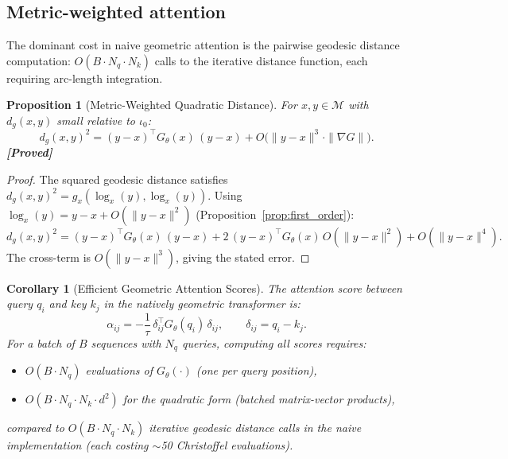 \documentclass[11pt,a4paper]{article}
\newtheorem{proposition}[theorem]{Proposition}
\newtheorem{corollary}[theorem]{Corollary}
\theoremstyle{definition}
\theoremstyle{remark}
\newcommand{\statusproved}{\textcolor{green!50!black}{\textbf{[Proved]}}}
\begin{document}
\subsection{Metric-weighted attention}\label{sec:metric_attention}

The dominant cost in naive geometric attention is the pairwise 
geodesic distance computation: $O(B \cdot N_q \cdot N_k)$ calls 
to the iterative distance function, each requiring arc-length 
integration.

\begin{proposition}[Metric-Weighted Quadratic Distance]%
\label{prop:metric_dist}
For $x, y \in \mathcal{M}$ with $d_g(x,y)$ small relative to 
$\iota_0$:
\begin{equation}\label{eq:metric_dist}
    d_g(x, y)^2 = (y - x)^\top G_\theta(x)\, (y - x) 
    + O\!\bigl(\|y - x\|^3 \cdot \|\nabla G\|\bigr).
\end{equation}
\statusproved
\end{proposition}

\begin{proof}
The squared geodesic distance satisfies 
$d_g(x,y)^2 = g_x(\log_x(y), \log_x(y))$. Using 
$\log_x(y) = y - x + O(\|y-x\|^2)$ 
(Proposition~\ref{prop:first_order}):
\[
  d_g(x,y)^2 = (y-x)^\top G_\theta(x)\,(y-x) 
  + 2\,(y-x)^\top G_\theta(x)\, O(\|y-x\|^2) 
  + O(\|y-x\|^4).
\]
The cross-term is $O(\|y-x\|^3)$, giving the stated error.
\end{proof}

\begin{corollary}[Efficient Geometric Attention Scores]%
\label{cor:efficient_attention}
The attention score between query $q_i$ and key $k_j$ in the 
natively geometric transformer is:
\begin{equation}\label{eq:geo_attention_score}
    \alpha_{ij} = -\frac{1}{\tau}\,\delta_{ij}^\top 
    G_\theta(q_i)\, \delta_{ij}, \qquad 
    \delta_{ij} = q_i - k_j.
\end{equation}
For a batch of $B$ sequences with $N_q$ queries, computing all 
scores requires:
\begin{itemize}[nosep]
  \item $O(B \cdot N_q)$ evaluations of $G_\theta(\cdot)$ 
  (one per query position),
  \item $O(B \cdot N_q \cdot N_k \cdot d^2)$ for the 
  quadratic form (batched matrix-vector products),
\end{itemize}
compared to $O(B \cdot N_q \cdot N_k)$ iterative geodesic 
distance calls in the naive implementation (each costing 
$\sim$50 Christoffel evaluations).
\end{corollary}
\end{document}
